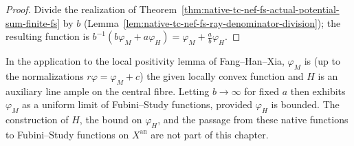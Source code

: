 \begin{proof}
Divide the realization of Theorem~\ref{thm:native-tc-nef-fs-actual-potential-sum-finite-fs}
by $b$ (Lemma~\ref{lem:native-tc-nef-fs-ray-denominator-division}); the resulting
function is $b^{-1}(b\varphi_M+a\varphi_H)=\varphi_M+\frac ab\varphi_H$.
\end{proof}

\begin{remark}
In the application to the local positivity lemma of Fang--Han--Xia, $\varphi_M$ is
(up to the normalizations $r\varphi=\varphi_M+c$) the given locally convex function and
$H$ is an auxiliary line ample on the central fibre.  Letting $b\to\infty$ for fixed $a$
then exhibits $\varphi_M$ as a uniform limit of Fubini--Study functions, provided
$\varphi_H$ is bounded.  The construction of $H$, the bound on $\varphi_H$, and the
passage from these native functions to Fubini--Study functions on $X^{\mathrm{an}}$ are
not part of this chapter.
\end{remark}

